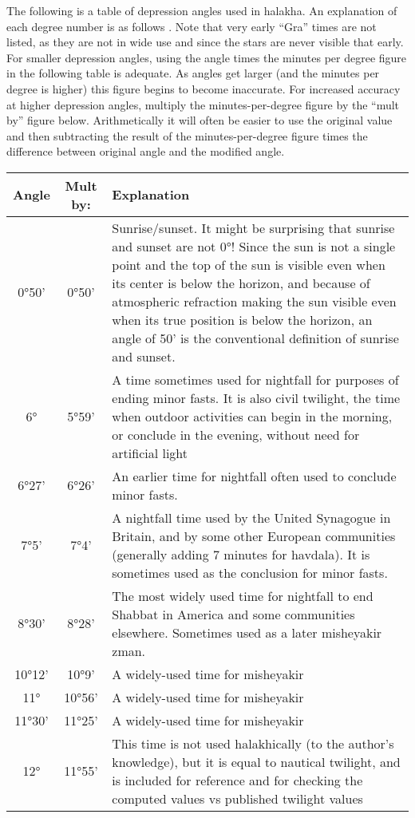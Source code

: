 The following is a table of depression angles used in halakha.  An explanation of each degree number is as follows \parencite{dvaryom}. Note that very early “Gra” times are not listed, as they are not in wide use and since the stars are never visible that early. For smaller depression angles, using the angle times the minutes per degree figure in the following table is adequate. As angles get larger (and the minutes per degree is higher) this figure begins to become inaccurate. For increased accuracy at higher depression angles, multiply the minutes-per-degree figure by the “mult by” figure below. Arithmetically it will often be easier to use the original value and then subtracting the result of the minutes-per-degree figure times the difference between original angle and the modified angle.

\begin{tabular}{c | c | p{}}
	Angle&Mult by:&Explanation\\\hline
	0°50'&0°50'&Sunrise/sunset. It might be surprising that sunrise and sunset are not 0°! Since the sun is not a single point and the top of the sun is visible even when its center is below the horizon, and because of atmospheric refraction making the sun visible even when its true position is below the horizon, an angle of 50' is the conventional definition of sunrise and sunset.\\\hline
	6°&5°59'&A time sometimes used for nightfall for purposes of ending minor fasts.  It is also civil twilight, the time when outdoor activities can begin in the morning, or conclude in the evening, without need for artificial light\\\hline
	6°27'&6°26'
	&An earlier time for nightfall often used to conclude minor fasts.\\\hline
	7°5'&7°4'&A nightfall time used by the United Synagogue in Britain, and by some other European communities (generally adding 7 minutes for havdala). It is sometimes used as the conclusion for minor fasts.\\\hline
	8°30'&8°28'&The most widely used time for nightfall to end Shabbat in America and some communities elsewhere. Sometimes used as a later misheyakir zman.\\\hline
	10°12'&10°9'&A widely-used time for misheyakir\\\hline
	11°&10°56'&A widely-used time for misheyakir\\\hline
	11°30'&11°25'&A widely-used time for misheyakir\\\hline
	12°&11°55'&This time is not used halakhically (to the author's knowledge), but it is equal to nautical twilight, and is included for reference and for checking the computed values vs published twilight values\\\hline

\end{tabular}
